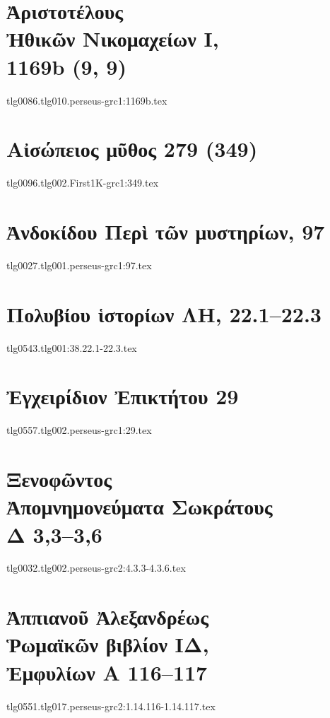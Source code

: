 \documentclass[a4paper,12pt,twoside]{report}
\begin{document}
\chapter[Ἀριστοτέλους Ἠθικῶν Νικομαχείων Ι]{\textgreek[variant=ancient]{Ἀριστοτέλους \\Ἠθικῶν Νικομαχείων Ι,} \\1169b (9, 9)}
{tlg0086.tlg010.perseus-grc1:1169b.tex}

\chapter[Αἰσώπειος μῦθος 279]{\textgreek[variant=ancient]{Αἰσώπειος μῦθος} 279 (349)}
{tlg0096.tlg002.First1K-grc1:349.tex}

\chapter[Ἀνδοκίδου Περὶ τῶν μυστηρίων]{\textgreek[variant=ancient]{Ἀνδοκίδου Περὶ τῶν μυστηρίων,} 97}
\label{chap:andocides}
{tlg0027.tlg001.perseus-grc1:97.tex}

\chapter[Πολυβίου Ἱστορίων ΛΗ]{\textgreek[variant=ancient]{Πολυβίου ἱστορίων ΛΗ,} 22.1–22.3}
{tlg0543.tlg001:38.22.1-22.3.tex}

\chapter[Ἐγχειρίδιον Ἐπικτήτου 29]{\textgreek[variant=ancient]{Ἐγχειρίδιον Ἐπικτήτου} 29}
{tlg0557.tlg002.perseus-grc1:29.tex}

\chapter[Ξενοφῶντος Ἀπομνημονεύματα Σωκράτους]{\textgreek[variant=ancient]{Ξενοφῶντος \\Ἀπομνημονεύματα Σωκράτους \\Δ} 3,3–3,6}
{tlg0032.tlg002.perseus-grc2:4.3.3-4.3.6.tex}

\chapter[Ἀππιανοῦ Ῥωμαϊκῶν ΙΔ]{\textgreek[variant=ancient]{Ἀππιανοῦ Ἀλεξανδρέως \\Ῥωμαϊκῶν βιβλίον ΙΔ, \\Ἐμφυλίων Α} 116–117}
{tlg0551.tlg017.perseus-grc2:1.14.116-1.14.117.tex}
\end{document}
